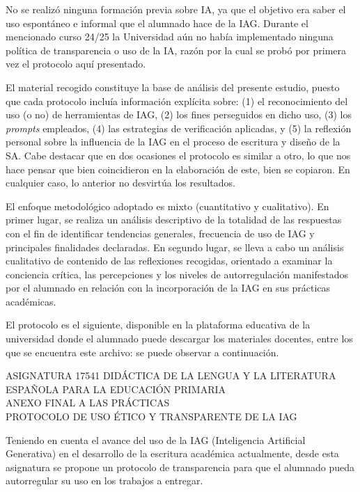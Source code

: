\documentclass[spanish]{textolivre}
\begin{document}
No se realizó ninguna formación previa sobre IA, ya que el objetivo era saber el uso espontáneo e informal que el alumnado hace de la IAG. Durante el mencionado curso 24/25 la Universidad aún no había implementado ninguna política de transparencia o uso de la IA, razón por la cual se probó por primera vez el protocolo aquí presentado.

El material recogido constituye la base de análisis del presente estudio, puesto que cada protocolo incluía información explícita sobre: (1) el reconocimiento del uso (o no) de herramientas de IAG, (2) los fines perseguidos en dicho uso, (3) los \textit{prompts} empleados, (4) las estrategias de verificación aplicadas, y (5) la reflexión personal sobre la influencia de la IAG en el proceso de escritura y diseño de la SA. Cabe destacar que en dos ocasiones el protocolo es similar a otro, lo que nos hace pensar que bien coincidieron en la elaboración de este, bien se copiaron. En cualquier caso, lo anterior no desvirtúa los resultados.

El enfoque metodológico adoptado es mixto (cuantitativo y cualitativo). En primer lugar, se realiza un análisis descriptivo de la totalidad de las respuestas con el fin de identificar tendencias generales, frecuencia de uso de IAG y principales finalidades declaradas. En segundo lugar, se lleva a cabo un análisis cualitativo de contenido de las reflexiones recogidas, orientado a examinar la conciencia crítica, las percepciones y los niveles de autorregulación manifestados por el alumnado en relación con la incorporación de la IAG en sus prácticas académicas.

El protocolo es el siguiente, disponible en la plataforma educativa de la universidad donde el alumnado puede descargar los materiales docentes, entre los que se encuentra este archivo: se puede observar a continuación.

{\centering ASIGNATURA 17541 DIDÁCTICA DE LA LENGUA Y LA LITERATURA ESPAÑOLA PARA LA EDUCACIÓN PRIMARIA \\ ANEXO FINAL A LAS PRÁCTICAS \\ PROTOCOLO DE USO ÉTICO Y TRANSPARENTE DE LA IAG \par}

Teniendo en cuenta el avance del uso de la IAG (Inteligencia Artificial Generativa) en el desarrollo de la escritura académica actualmente, desde esta asignatura se propone un protocolo de transparencia para que el alumnado pueda autorregular su uso en los trabajos a entregar.
\end{document}
